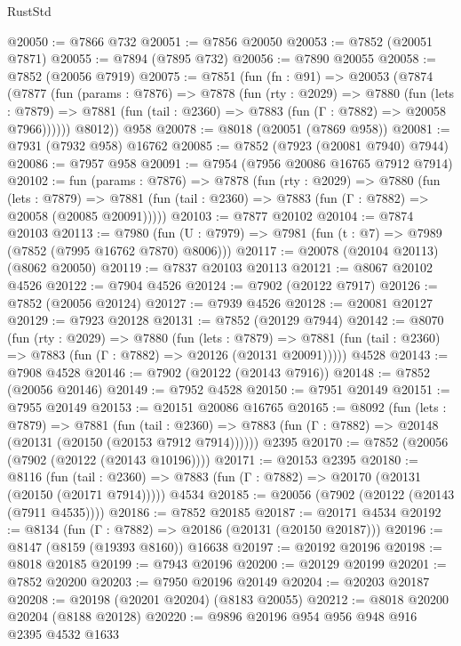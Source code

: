 \begin{lexlean}{RustStd}
\begin{coremodule}
@20050 := @7866 @732
@20051 := @7856 @20050
@20053 := @7852 (@20051 @7871)
@20055 := @7894 (@7895 @732)
@20056 := @7890 @20055
@20058 := @7852 (@20056 @7919)
@20075 := @7851
    (fun (fn : @91) =>
    @20053
      (@7874
        (@7877
          (fun (params : @7876) =>
          @7878
            (fun (rty : @2029) =>
            @7880
              (fun (lets : @7879) =>
              @7881 (fun (tail : @2360) => @7883 (fun (Γ : @7882) => @20058 @7966))))))
        @8012))
    @958
@20078 := @8018 (@20051 (@7869 @958))
@20081 := @7931 (@7932 @958) @16762
@20085 := @7852 (@7923 (@20081 @7940) @7944)
@20086 := @7957 @958
@20091 := @7954 (@7956 @20086 @16765 @7912 @7914)
@20102 := fun (params : @7876) =>
  @7878
    (fun (rty : @2029) =>
    @7880
      (fun (lets : @7879) =>
      @7881 (fun (tail : @2360) => @7883 (fun (Γ : @7882) => @20058 (@20085 @20091)))))
@20103 := @7877 @20102
@20104 := @7874 @20103
@20113 := @7980
    (fun (U : @7979) => @7981 (fun (t : @7) => @7989 (@7852 (@7995 @16762 @7870) @8006)))
@20117 := @20078 (@20104 @20113) (@8062 @20050)
@20119 := @7837 @20103 @20113
@20121 := @8067 @20102 @4526
@20122 := @7904 @4526
@20124 := @7902 (@20122 @7917)
@20126 := @7852 (@20056 @20124)
@20127 := @7939 @4526
@20128 := @20081 @20127
@20129 := @7923 @20128
@20131 := @7852 (@20129 @7944)
@20142 := @8070
    (fun (rty : @2029) =>
    @7880
      (fun (lets : @7879) =>
      @7881 (fun (tail : @2360) => @7883 (fun (Γ : @7882) => @20126 (@20131 @20091)))))
    @4528
@20143 := @7908 @4528
@20146 := @7902 (@20122 (@20143 @7916))
@20148 := @7852 (@20056 @20146)
@20149 := @7952 @4528
@20150 := @7951 @20149
@20151 := @7955 @20149
@20153 := @20151 @20086 @16765
@20165 := @8092
    (fun (lets : @7879) =>
    @7881
      (fun (tail : @2360) =>
      @7883 (fun (Γ : @7882) => @20148 (@20131 (@20150 (@20153 @7912 @7914))))))
    @2395
@20170 := @7852 (@20056 (@7902 (@20122 (@20143 @10196))))
@20171 := @20153 @2395
@20180 := @8116
    (fun (tail : @2360) => @7883 (fun (Γ : @7882) => @20170 (@20131 (@20150 (@20171 @7914)))))
    @4534
@20185 := @20056 (@7902 (@20122 (@20143 (@7911 @4535))))
@20186 := @7852 @20185
@20187 := @20171 @4534
@20192 := @8134 (fun (Γ : @7882) => @20186 (@20131 (@20150 @20187)))
@20196 := @8147 (@8159 (@19393 @8160)) @16638
@20197 := @20192 @20196
@20198 := @8018 @20185
@20199 := @7943 @20196
@20200 := @20129 @20199
@20201 := @7852 @20200
@20203 := @7950 @20196 @20149
@20204 := @20203 @20187
@20208 := @20198 (@20201 @20204) (@8183 @20055)
@20212 := @8018 @20200 @20204 (@8188 @20128)
@20220 := @9896 @20196 @954 @956 @948 @916 @2395 @4532 @1633

\end{coremodule}
\end{lexlean}
